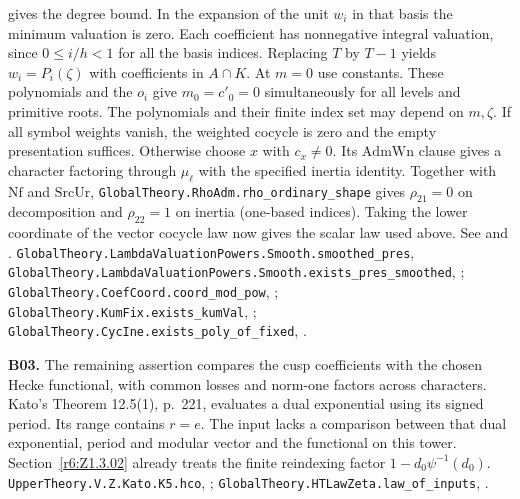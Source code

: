 gives the degree bound. In the expansion of the unit \(w_i\) in that
basis the minimum valuation is zero. Each coefficient has nonnegative
integral valuation, since \(0\le i/h<1\) for all the basis indices.
Replacing \(T\) by \(T-1\) yields \(w_i=P_i(\zeta)\) with coefficients
in \(A\cap K\). At \(m=0\) use constants. These polynomials and the
\(o_i\) give \(m_0=c'_0=0\) simultaneously for all levels and primitive roots. The polynomials and their finite index set may depend on \(m,\zeta\).
If all symbol weights vanish, the weighted cocycle is zero and the empty presentation suffices. Otherwise choose \(x\) with \(c_x\ne0\).
Its \(\mathrm{AdmWn}\) clause gives a character factoring through \(\mu_\ell\) with the specified inertia identity. Together with \(\mathrm{Nf}\) and \(\mathrm{SrcUr}\), \nolinkurl{GlobalTheory.RhoAdm.rho_ordinary_shape} gives \(\rho_{21}=0\) on decomposition and \(\rho_{22}=1\) on inertia (one-based indices).
Taking the lower coordinate of the vector cocycle law now gives the scalar law used above. See  and .
\nolinkurl{GlobalTheory.LambdaValuationPowers.Smooth.smoothed_pres},
\nolinkurl{GlobalTheory.LambdaValuationPowers.Smooth.exists_pres_smoothed},
;
\nolinkurl{GlobalTheory.CoefCoord.coord_mod_pow},
;
\nolinkurl{GlobalTheory.KumFix.exists_kumVal},
;
\nolinkurl{GlobalTheory.CycIne.exists_poly_of_fixed},
.

\textbf{B03.} The remaining assertion compares the cusp coefficients
with the chosen Hecke functional, with common losses and norm-one
factors across characters. Kato's Theorem 12.5(1), p.~221, evaluates
a dual exponential using its signed period. Its range contains \(r=e\).
The input lacks a comparison between that dual exponential, period and
modular vector and the functional on this tower. Section~\ref{r6:Z1.3.02}
already treats the finite reindexing factor \(1-d_0\psi^{-1}(d_0)\).
\nolinkurl{UpperTheory.V.Z.Kato.K5.hco}, ;
\nolinkurl{GlobalTheory.HTLawZeta.law_of_inputs}, .

